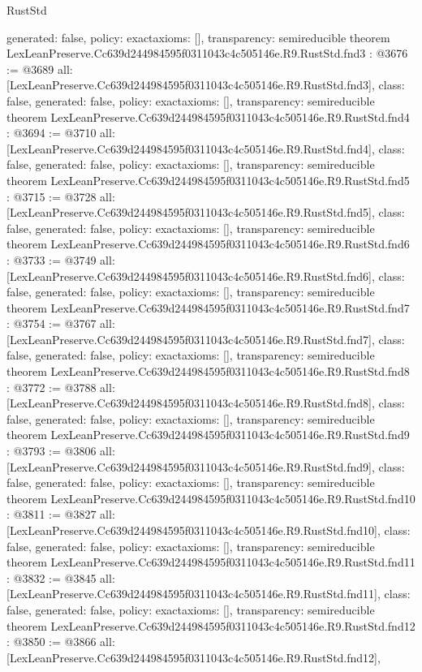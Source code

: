 \begin{lexlean}{RustStd}
\begin{coremodule}
{  generated: false,
  policy: exact{axioms: []},
  transparency: semireducible
}
theorem LexLeanPreserve.Cc639d244984595f0311043c4c505146e.R9.RustStd.fnd3 : @3676 := @3689 {
  all: [LexLeanPreserve.Cc639d244984595f0311043c4c505146e.R9.RustStd.fnd3],
  class: false,
  generated: false,
  policy: exact{axioms: []},
  transparency: semireducible
}
theorem LexLeanPreserve.Cc639d244984595f0311043c4c505146e.R9.RustStd.fnd4 : @3694 := @3710 {
  all: [LexLeanPreserve.Cc639d244984595f0311043c4c505146e.R9.RustStd.fnd4],
  class: false,
  generated: false,
  policy: exact{axioms: []},
  transparency: semireducible
}
theorem LexLeanPreserve.Cc639d244984595f0311043c4c505146e.R9.RustStd.fnd5 : @3715 := @3728 {
  all: [LexLeanPreserve.Cc639d244984595f0311043c4c505146e.R9.RustStd.fnd5],
  class: false,
  generated: false,
  policy: exact{axioms: []},
  transparency: semireducible
}
theorem LexLeanPreserve.Cc639d244984595f0311043c4c505146e.R9.RustStd.fnd6 : @3733 := @3749 {
  all: [LexLeanPreserve.Cc639d244984595f0311043c4c505146e.R9.RustStd.fnd6],
  class: false,
  generated: false,
  policy: exact{axioms: []},
  transparency: semireducible
}
theorem LexLeanPreserve.Cc639d244984595f0311043c4c505146e.R9.RustStd.fnd7 : @3754 := @3767 {
  all: [LexLeanPreserve.Cc639d244984595f0311043c4c505146e.R9.RustStd.fnd7],
  class: false,
  generated: false,
  policy: exact{axioms: []},
  transparency: semireducible
}
theorem LexLeanPreserve.Cc639d244984595f0311043c4c505146e.R9.RustStd.fnd8 : @3772 := @3788 {
  all: [LexLeanPreserve.Cc639d244984595f0311043c4c505146e.R9.RustStd.fnd8],
  class: false,
  generated: false,
  policy: exact{axioms: []},
  transparency: semireducible
}
theorem LexLeanPreserve.Cc639d244984595f0311043c4c505146e.R9.RustStd.fnd9 : @3793 := @3806 {
  all: [LexLeanPreserve.Cc639d244984595f0311043c4c505146e.R9.RustStd.fnd9],
  class: false,
  generated: false,
  policy: exact{axioms: []},
  transparency: semireducible
}
theorem LexLeanPreserve.Cc639d244984595f0311043c4c505146e.R9.RustStd.fnd10 : @3811 := @3827 {
  all: [LexLeanPreserve.Cc639d244984595f0311043c4c505146e.R9.RustStd.fnd10],
  class: false,
  generated: false,
  policy: exact{axioms: []},
  transparency: semireducible
}
theorem LexLeanPreserve.Cc639d244984595f0311043c4c505146e.R9.RustStd.fnd11 : @3832 := @3845 {
  all: [LexLeanPreserve.Cc639d244984595f0311043c4c505146e.R9.RustStd.fnd11],
  class: false,
  generated: false,
  policy: exact{axioms: []},
  transparency: semireducible
}
theorem LexLeanPreserve.Cc639d244984595f0311043c4c505146e.R9.RustStd.fnd12 : @3850 := @3866 {
  all: [LexLeanPreserve.Cc639d244984595f0311043c4c505146e.R9.RustStd.fnd12],
}
\end{coremodule}
\end{lexlean}

